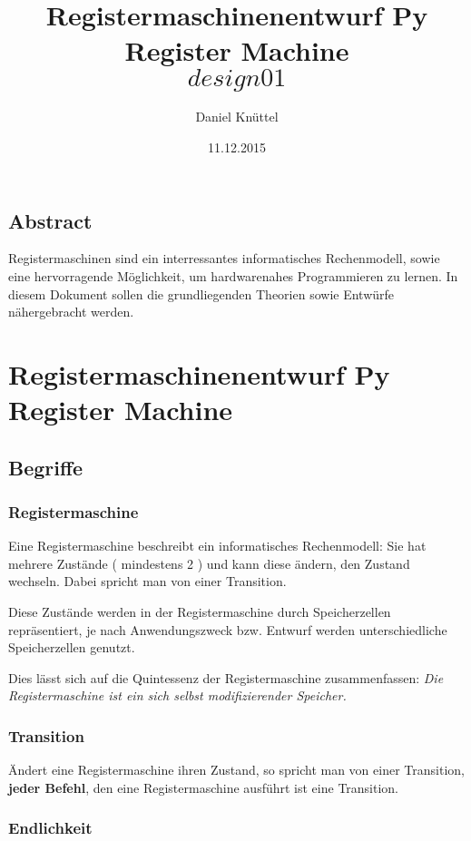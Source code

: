 \documentclass[a4paper,12pt,oneside]{scrreprt}
\title{ Registermaschinenentwurf Py Register Machine \[design01\]}
\author{Daniel Knüttel}
\date{11.12.2015}
\begin{document}
\maketitle
\tableofcontents

\chapter{Abstract}

Registermaschinen sind ein interressantes informatisches Rechenmodell, sowie eine hervorragende Möglichkeit, um
hardwarenahes Programmieren zu lernen. In diesem Dokument sollen die grundliegenden Theorien sowie Entwürfe nähergebracht werden.

\part{Registermaschinenentwurf Py Register Machine}


\chapter{Begriffe}
\section{Registermaschine}

Eine Registermaschine beschreibt ein informatisches Rechenmodell: Sie hat mehrere Zustände ( mindestens 2 ) 
und kann diese ändern, den Zustand wechseln. Dabei spricht man von einer Transition.

Diese Zustände werden in der Registermaschine durch Speicherzellen repräsentiert, je nach Anwendungszweck bzw. Entwurf werden unterschiedliche Speicherzellen genutzt.

Dies lässt sich auf die Quintessenz der Registermaschine zusammenfassen: \textit{Die Registermaschine ist ein sich selbst modifizierender Speicher.}

\section{Transition}

Ändert eine Registermaschine ihren Zustand, so spricht man von einer Transition, \textbf{jeder Befehl}, den eine Registermaschine ausführt ist eine Transition.

\section{Endlichkeit}
\end{document}
